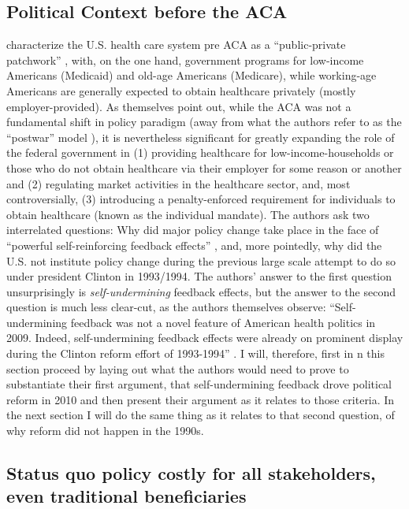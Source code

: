 \documentclass[11pt]{article}
\begin{document}

\subsection*{Political Context before the ACA}

\textcite[][]{Jacobs2014} characterize the U.S. health care system pre ACA as a \enquote{public-private patchwork} , with, on the one hand, government programs for low-income Americans (Medicaid) and old-age Americans (Medicare), while working-age Americans are generally expected to obtain healthcare privately (mostly employer-provided). As \textcite[][]{Jacobs2014} themselves point out, while the ACA was not a fundamental shift in policy paradigm (away from what the authors refer to as the \enquote{postwar} model ), it is nevertheless significant for greatly expanding the role of the federal government in (1) providing healthcare for low-income-households or those who do not obtain healthcare via their employer for some reason or another and (2) regulating market activities in the healthcare sector, and, most controversially, (3) introducing a penalty-enforced requirement for individuals to obtain healthcare (known as the individual mandate). The authors ask two interrelated questions: Why did major policy change take place in the face of \enquote{powerful self-reinforcing feedback effects} \parencite[][p. 451]{Jacobs2014}, and, more pointedly, why did the U.S. not institute policy change during the previous large scale attempt to do so under president Clinton in 1993/1994. The authors' answer to the first question unsurprisingly is \textit{self-undermining} feedback effects, but the answer to the second question is much less clear-cut, as the authors themselves observe: \enquote{Self-undermining feedback was not a novel feature of American health politics in 2009. Indeed, self-undermining feedback effects were already on prominent display during the Clinton reform effort of 1993-1994} \parencite[][p. 451]{Jacobs2014}. I will, therefore, first in n this section proceed by laying out what the authors would need to prove to substantiate their first argument, that self-undermining feedback drove political reform in 2010 and then present their argument as it relates to those criteria. In the next section I will do the same thing as it relates to that second question, of why reform did not happen in the 1990s.

\subsection*{Status quo policy costly for all stakeholders, even traditional beneficiaries}
\end{document}
